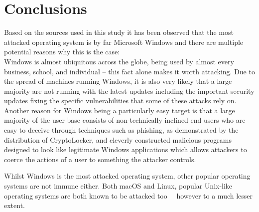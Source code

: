 \documentclass[10pt,a4paper]{article}
\begin{document}
\section{Conclusions}

Based on the sources used in this study it has been observed that the most attacked operating system is by far Microsoft Windows and there are multiple potential reasons why this is the case: \\
Windows is almost ubiquitous across the globe, being used by almost every business, school, and individual -- this fact alone makes it worth attacking. Due to the spread of machines running Windows, it is also very likely that a large majority are not running with the latest updates including the important security updates fixing the specific vulnerabilities that some of these attacks rely on.\\
Another reason for Windows being a particularly easy target is that a large majority of the user base consists of non-technically inclined end users who are easy to deceive through techniques such as phishing, as demonstrated by the distribution of CryptoLocker, and cleverly constructed malicious programs designed to look like legitimate Windows applications which allows attackers to coerce the actions of a user to something the attacker controls.

Whilst Windows is the most attacked operating system, other popular operating systems are not immune either. Both macOS and Linux, popular Unix-like operating systems are both known to be attacked too~\cite{linuxRansomware}~\cite{osxRansomware} however to a much lesser extent.
\end{document}
